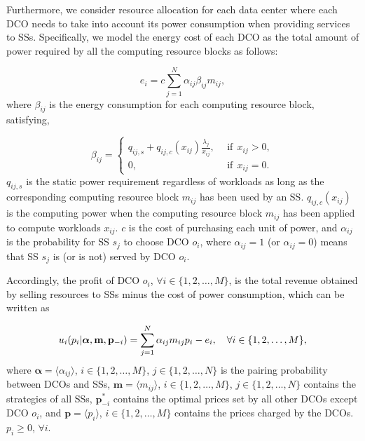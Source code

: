 \documentclass[twocolumn,10pt]{IEEEtran}
\begin{document}
Furthermore, we consider resource allocation for each data center where each DCO needs to take into account its power consumption when providing services to SSs. Specifically, we model the energy cost of each DCO as the total amount of power required by all the computing resource blocks as follows\cite{SRen01}:

\begin{equation}
      e_{i} =  c \sum\limits_{j = 1}^N {{\alpha _{ij}}{\beta _{ij}}{m_{ij}}} ,
\end{equation}
where $\beta _{ij}$ is the energy consumption for each computing resource block, satisfying,

\begin{equation}
      \beta _{ij}=\left\{ {\begin{array}{*{20}{c}}
  {{q_{ij,s}} + {q_{ij,c}}({x_{ij}})\frac{{{\lambda _{j}}}}{{{x_{ij}}}}}, & {~~\text{if}~~x_{ij}>0},  \\
  {0}, & {~~\text{if}~~x_{ij}=0}.
\end{array}}\right.
\end{equation}
$q_{ij,s}$ is the static power requirement regardless of workloads as long as the corresponding computing resource block $m_{ij}$ has been used by an SS. ${q_{ij,c}}({x_{ij}})$ is the computing power when the computing resource block $m_{ij}$ has been applied to compute workloads $x_{ij}$. $c$ is the cost of purchasing each unit of power, and $\alpha _{ij}$ is the probability for SS $s_j$ to choose DCO $o_i$, where $\alpha _{ij}=1$ (or $\alpha _{ij}=0$) means that SS $s_j$ is (or is not) served by DCO $o_i$.


Accordingly, the profit of DCO $o_i$, $\forall i \in \{1,2,\ldots,M\}$, is the total revenue obtained by selling resources to SSs minus the cost of power consumption, which can be written as

\begin{equation}\label{utility_dco}
  u_{i}(  {p_i}| \boldsymbol{\alpha}, \mathbf{m}, \mathbf{p}_{-i}) = \sum\limits_{j = 1}^N {{\alpha _{ij}}{m_{ij}} p_{i} } -e_{i}, ~~~ \forall i \in \{1,2,\ldots,M\},\hfill
\end{equation}
where $\boldsymbol{\alpha}=\langle \alpha_{ij} \rangle$, $i\in \{1,2,\ldots,M\}$, $j\in\{1,2,\ldots,N\}$ is the pairing probability between DCOs and SSs, $\mathbf{m}=\langle m_{ij} \rangle$, $i\in \{1,2,\ldots,M\}$, $j\in\{1,2,\ldots,N\}$ contains the strategies of all SSs, $\mathbf{p}^*_{-i}$ contains the optimal prices set by all other DCOs except DCO $o_i$, and $\mathbf{p}=\langle p_i \rangle$, $i\in \{1,2,\ldots,M\}$ contains the prices charged by the DCOs. $p_{i} \geqslant 0$, $\forall i$.
\end{document}
